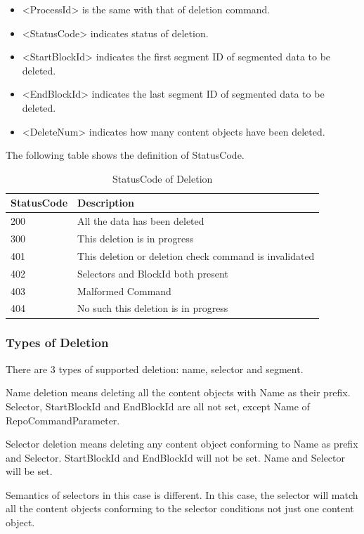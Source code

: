 \documentclass{acm_proc_article-sp}
\begin{document}
\begin{itemize}
\item <ProcessId> is the same with that of deletion command.
\item <StatusCode> indicates status of deletion.
\item <StartBlockId> indicates the first segment ID of segmented data to be deleted.
\item <EndBlockId> indicates the last segment ID of segmented data to be deleted.
\item <DeleteNum> indicates how many content objects have been deleted.
\end{itemize}

The following table shows the definition of StatusCode.

\begin{table}[!hbp]
\centering

\begin{tabular}{l l}

\hline
StatusCode & Description \\
\hline
200 & All the data has been deleted \\
300 & This deletion is in progress \\
401 & This deletion or deletion check command is invalidated \\
402 & Selectors and BlockId both present\\
403 & Malformed Command \\
404 & No such this deletion  is in progress \\
\hline

\end{tabular}
\caption{StatusCode of Deletion}
\end{table}

\subsubsection{Types of Deletion}
There are 3 types of supported deletion: name, selector and segment.

Name deletion means deleting all the content objects with Name as their prefix. Selector, StartBlockId and EndBlockId are all not set, except Name of RepoCommandParameter.

Selector deletion means deleting any content object conforming to Name as prefix and Selector. StartBlockId and EndBlockId will not be set. Name and Selector will be set.

Semantics of selectors in this case is different. In this case, the selector will match all the content objects conforming to the selector conditions not just one content object.
\end{document}
